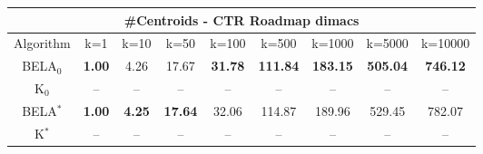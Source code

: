 \begin{tabular}{c|cccccccc}\toprule
\multicolumn{9}{c}{#Centroids - CTR Roadmap dimacs}\\ \midrule
Algorithm & k=1 & k=10 & k=50 & k=100 & k=500 & k=1000 & k=5000 & k=10000 \\ \midrule
BELA$_0$ & \textbf{1.00} & 4.26 & 17.67 & \textbf{31.78} & \textbf{111.84} & \textbf{183.15} & \textbf{505.04} & \textbf{746.12} \\
K$_0$ & -- & -- & -- & -- & -- & -- & -- & -- \\
BELA$^*$ & \textbf{1.00} & \textbf{4.25} & \textbf{17.64} & 32.06 & 114.87 & 189.96 & 529.45 & 782.07 \\
K$^*$ & -- & -- & -- & -- & -- & -- & -- & -- \\ \bottomrule 
\end{tabular}
